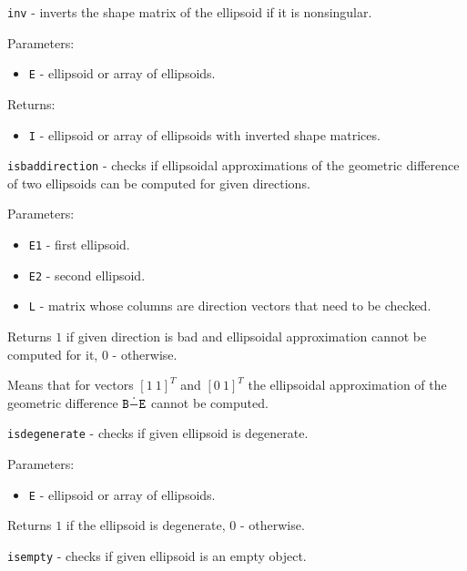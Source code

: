 \documentclass{report}
\begin{document}


\newpage

{\Large {\tt inv}} - inverts the shape matrix of the ellipsoid if it is
nonsingular.

Parameters:
\begin{itemize}
\item {\tt E} - ellipsoid or array of ellipsoids.
\end{itemize}

Returns:
\begin{itemize}
\item {\tt I} - ellipsoid or array of ellipsoids with inverted shape matrices.
\end{itemize}

\newpage

{\Large {\tt isbaddirection}} - checks if ellipsoidal approximations of
the geometric difference of two ellipsoids can be computed for given
directions.

Parameters:
\begin{itemize}
\item {\tt E1} - first ellipsoid.
\item {\tt E2} - second ellipsoid.
\item {\tt L} - matrix whose columns are direction vectors that need to be
checked.
\end{itemize}

Returns $1$ if given direction is bad and ellipsoidal approximation cannot
be computed for it, $0$ - otherwise.


Means that for vectors $[1 ~ 1]^T$ and $[0 ~ 1]^T$ the ellipsoidal approximation
of the geometric difference ${\tt B}\dot{-}{\tt E}$ cannot be computed.

\newpage

{\Large {\tt isdegenerate}} - checks if given ellipsoid is degenerate.

Parameters:
\begin{itemize}
\item {\tt E} - ellipsoid or array of ellipsoids.
\end{itemize}

Returns $1$ if the ellipsoid is degenerate, $0$ - otherwise.

\newpage

{\Large {\tt isempty}} - checks if given ellipsoid is an empty object.
\end{document}
